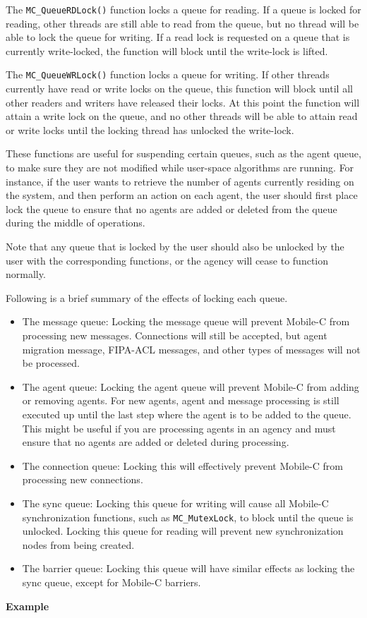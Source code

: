 The \texttt{MC\_QueueRDLock()} function locks a queue for reading. If a queue
is locked for reading, other threads are still able to read from the queue, but
no thread will be able to lock the queue for writing. If a read lock is
requested on a queue that is currently write-locked, the function will block
until the write-lock is lifted.

The \texttt{MC\_QueueWRLock()} function locks a queue for writing. If other
threads currently have read or write locks on the queue, this function 
will block until all other readers and writers have released their locks.
At this point the function will attain a write lock on the queue, and no
other threads will be able to attain read or write locks until the 
locking thread has unlocked the write-lock.

These functions are useful for suspending certain queues, such as the agent queue,
to make sure they are not modified while user-space algorithms are running. For
instance, if the user wants to retrieve the number of agents currently residing on the
system, and then perform an action on each agent, the user should first place lock the queue
to ensure that no agents are added or deleted from the queue during the middle of operations.

Note that any queue that is locked by the user should also be unlocked by the user with 
the corresponding functions, or the agency will cease to function normally. 

Following is a brief summary of the effects of locking each queue.
\begin{itemize}
\item The message queue: Locking the message queue will prevent Mobile-C from
processing new messages. Connections will still be accepted, but agent
migration message, FIPA-ACL messages, and other types of messages will not be
processed.
\item The agent queue: Locking the agent queue will prevent Mobile-C from
adding or removing agents. For new agents, agent and message processing is
still executed up until the last step where the agent is to be added to the
queue. This might be useful if you are processing agents in an agency and must
ensure that no agents are added or deleted during processing.
\item The connection queue: Locking this will effectively prevent Mobile-C from
processing new connections.
\item The sync queue: Locking this queue for writing will cause all Mobile-C
synchronization functions, such as \texttt{MC\_MutexLock}, to block until the
queue is unlocked. Locking this queue for reading will prevent new
synchronization nodes from being created.
\item The barrier queue: Locking this queue will have similar effects as
locking the sync queue, except for Mobile-C barriers.
\end{itemize}
\noindent
{\bf Example}\\
\noindent

\noindent

